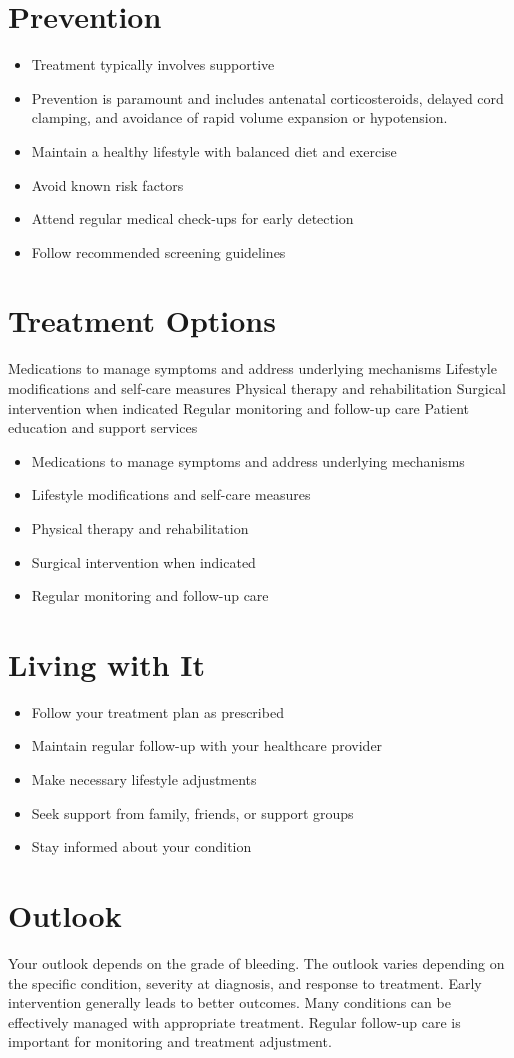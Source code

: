 \section{Prevention}
\begin{itemize}[noitemsep]
  \item Treatment typically involves supportive
  \item Prevention is paramount and includes antenatal corticosteroids, delayed cord clamping, and avoidance of rapid volume expansion or hypotension.
  \item Maintain a healthy lifestyle with balanced diet and exercise
  \item Avoid known risk factors
  \item Attend regular medical check-ups for early detection
  \item Follow recommended screening guidelines
\end{itemize}
\section{Treatment Options}
Medications to manage symptoms and address underlying mechanisms Lifestyle modifications and self-care measures Physical therapy and rehabilitation Surgical intervention when indicated Regular monitoring and follow-up care Patient education and support services

\begin{itemize}[noitemsep]
  \item Medications to manage symptoms and address underlying mechanisms
  \item Lifestyle modifications and self-care measures
  \item Physical therapy and rehabilitation
  \item Surgical intervention when indicated
  \item Regular monitoring and follow-up care
\end{itemize}
\section{Living with It}
\begin{itemize}[noitemsep]
  \item Follow your treatment plan as prescribed
  \item Maintain regular follow-up with your healthcare provider
  \item Make necessary lifestyle adjustments
  \item Seek support from family, friends, or support groups
  \item Stay informed about your condition
\end{itemize}
\section{Outlook}
Your outlook depends on the grade of bleeding. The outlook varies depending on the specific condition, severity at diagnosis, and response to treatment. Early intervention generally leads to better outcomes. Many conditions can be effectively managed with appropriate treatment. Regular follow-up care is important for monitoring and treatment adjustment.
